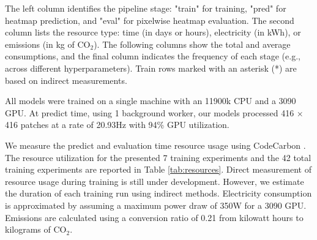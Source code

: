 \documentclass[10pt,twocolumn,letterpaper]{article}
\newcommand{\cotwo}{\ensuremath{\mathrm{CO_2}}}
\begin{document}
\begin{table}[t]
{The left column identifies the pipeline stage:
"train" for training, "pred" for heatmap prediction, and "eval" for pixelwise heatmap evaluation.
The second column lists the resource type: time (in days or hours), electricity (in kWh), or emissions (in
  kg of \cotwo{}).
The following columns show the total and average consumptions, and the final column indicates the
  frequency of each stage (e.g., across different hyperparameters).
Train rows marked with an asterisk (*) are based on indirect measurements.
}
\end{table}

All models were trained on a single machine with an 11900k CPU and a 3090 GPU.
At predict time, using 1 background worker, our models processed 416 $\times$
416 patches at a rate of 20.93Hz with 94\% GPU utilization.

We measure the predict and evaluation time resource usage using CodeCarbon
\cite{lacoste2019codecarbon}.
The resource utilization for the presented 7 training experiments and the 42
total training experiments are reported in
Table \ref{tab:resources}.
Direct measurement of resource usage during training is still under
development. However, we estimate the duration of each training run using
indirect methods. Electricity consumption is approximated by assuming a maximum
power draw of 350W for a 3090 GPU. Emissions are calculated using a conversion
ratio of 0.21 from kilowatt hours to kilograms of \cotwo{}.
\end{document}

